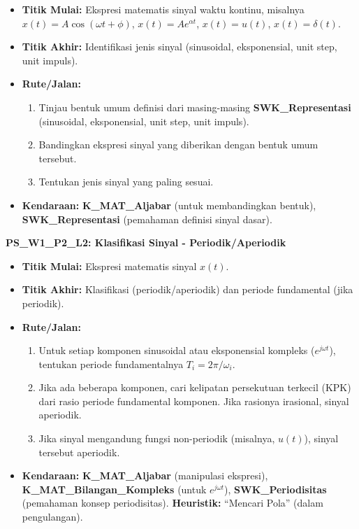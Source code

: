 \documentclass[
  letterpaper,
  DIV=11,
  numbers=noendperiod]{scrreprt}
\providecommand{\tightlist}{%
  \setlength{\itemsep}{0pt}\setlength{\parskip}{0pt}}
\begin{document}
\begin{itemize}
\tightlist
\item
  \textbf{Titik Mulai:} Ekspresi matematis sinyal waktu kontinu,
  misalnya \(x(t) = A \cos(\omega t + \phi)\),
  \(x(t) = A e^{\alpha t}\), \(x(t) = u(t)\), \(x(t) = \delta(t)\).
\item
  \textbf{Titik Akhir:} Identifikasi jenis sinyal (sinusoidal,
  eksponensial, unit step, unit impuls).
\item
  \textbf{Rute/Jalan:}

  \begin{enumerate}
  \def\labelenumi{\arabic{enumi}.}
  \tightlist
  \item
    Tinjau bentuk umum definisi dari masing-masing
    \textbf{SWK\_Representasi} (sinusoidal, eksponensial, unit step,
    unit impuls).
  \item
    Bandingkan ekspresi sinyal yang diberikan dengan bentuk umum
    tersebut.
  \item
    Tentukan jenis sinyal yang paling sesuai.
  \end{enumerate}
\item
  \textbf{Kendaraan:} \textbf{K\_MAT\_Aljabar} (untuk membandingkan
  bentuk), \textbf{SWK\_Representasi} (pemahaman definisi sinyal dasar).
\end{itemize}

\textbf{PS\_W1\_P2\_L2: Klasifikasi Sinyal - Periodik/Aperiodik}

\begin{itemize}
\tightlist
\item
  \textbf{Titik Mulai:} Ekspresi matematis sinyal \(x(t)\).
\item
  \textbf{Titik Akhir:} Klasifikasi (periodik/aperiodik) dan periode
  fundamental (jika periodik).
\item
  \textbf{Rute/Jalan:}

  \begin{enumerate}
  \def\labelenumi{\arabic{enumi}.}
  \tightlist
  \item
    Untuk setiap komponen sinusoidal atau eksponensial kompleks
    (\(e^{j\omega t}\)), tentukan periode fundamentalnya
    \(T_i = 2\pi / \omega_i\).
  \item
    Jika ada beberapa komponen, cari kelipatan persekutuan terkecil
    (KPK) dari rasio periode fundamental komponen. Jika rasionya
    irasional, sinyal aperiodik.
  \item
    Jika sinyal mengandung fungsi non-periodik (misalnya, \(u(t)\)),
    sinyal tersebut aperiodik.
  \end{enumerate}
\item
  \textbf{Kendaraan:} \textbf{K\_MAT\_Aljabar} (manipulasi ekspresi),
  \textbf{K\_MAT\_Bilangan\_Kompleks} (untuk \(e^{j\omega t}\)),
  \textbf{SWK\_Periodisitas} (pemahaman konsep periodisitas).
  \textbf{Heuristik:} ``Mencari Pola'' (dalam pengulangan).
\end{itemize}
\end{document}
